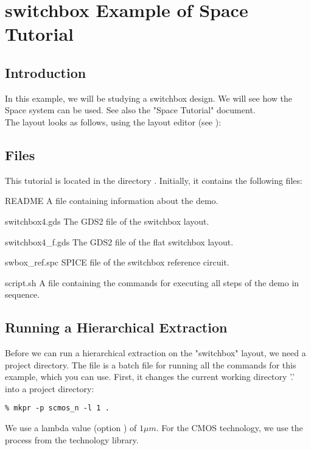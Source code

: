 \chapter{switchbox Example of Space Tutorial}
\section{Introduction}
\label{SOintro}
In this example, we will be studying a switchbox design.
We will see how the Space system can be used.
See also the "Space Tutorial" document.
\\[1 ex]
The layout looks as follows, using the layout editor  (see ):

\begin{figure}[h]
\centerline{}
\end{figure}

\section{Files}
This tutorial is located in the directory .
Initially, it contains the following files:
\begin{filelist}
\item[README] A file containing information about the demo.
\item[switchbox4.gds] The GDS2 file of the switchbox layout.
\item[switchbox4\_f.gds] The GDS2 file of the flat switchbox layout.
\item[swbox\_ref.spc] SPICE file of the switchbox reference circuit.
\item[script.sh] A file containing the commands for executing all
steps of the demo in sequence.
\end{filelist}

\section{Running a Hierarchical Extraction}
Before we can run a hierarchical extraction on the "switchbox" layout, we need a project directory.
The file  is a batch file for running all the commands for this example, which you can use.
First, it changes the current working directory '.' into a project directory:
\small
\begin{Verbatim}
% mkpr -p scmos_n -l 1 .
\end{Verbatim}
\normalsize
We use a lambda value (option ) of $1 \mu m$.
For the CMOS technology, we use the  process from the technology library.

